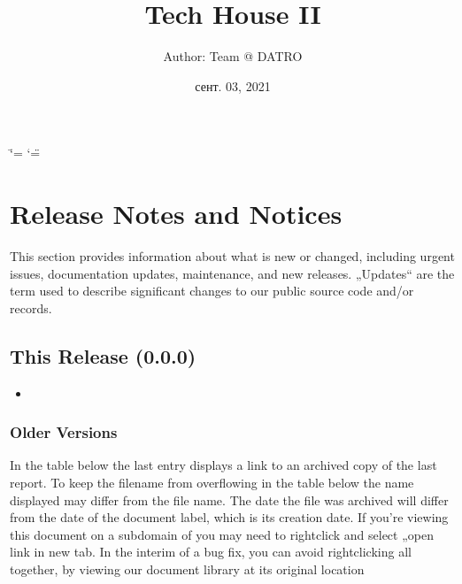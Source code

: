 \documentclass[letterpaper,10pt,openany,oneside,russian]{sphinxmanual}
\title{Tech House II}
\date{сент. 03, 2021}
\author{Author: Team @ DATRO}
\begin{document}
\ifdefined\shorthandoff
  \ifnum\catcode`\=\string=\active\shorthandoff{=}\fi
  \ifnum\catcode`\"=\active{}\fi
\fi

\pagestyle{empty}
\sphinxmaketitle
\pagestyle{plain}
\sphinxtableofcontents
\pagestyle{normal}
\label{\detokenize{index::doc}}





\chapter{Release Notes and Notices}
\label{\detokenize{releasenotes:release-notes-and-notices}}\label{\detokenize{releasenotes::doc}}
\sphinxAtStartPar
This section provides information about what is new or changed, including urgent issues, documentation updates, maintenance, and new releases.
\sphinxhyphen{} „Updates“ are the term used to describe significant changes to our public source code and/or records.


\section{This Release (0.0.0)}
\label{\detokenize{releasenotes:this-release-0-0-0}}\begin{itemize}
\item {} 
\sphinxAtStartPar
{} \sphinxhyphen{} 

\end{itemize}


\subsection{Older Versions}
\label{\detokenize{releasenotes:older-versions}}
\sphinxAtStartPar
In the table below the last entry displays a link to an archived copy of the last report.
To keep the filename from overflowing in the table below the name displayed may differ from the file name.
The date the file was archived will differ from the date of the document label, which is its creation date.
If you’re viewing this document on a subdomain of  you may need to right\sphinxhyphen{}click and select „open link in new tab\textasciigrave{}.
In the interim of a bug fix, you can avoid right\sphinxhyphen{}clicking all together, by viewing our document library at its original location 
\end{document}
